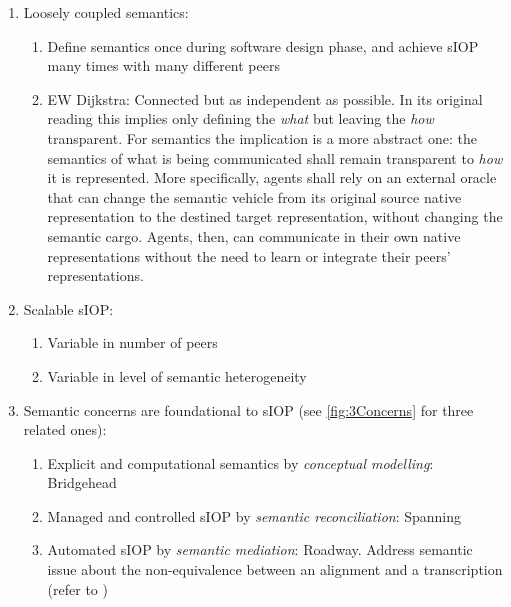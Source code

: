 \documentclass[a4paper,11pt,oneside,oldfontcommands]{memoir}
\theoremstyle{definition}
\theoremstyle{break}		%
\numberwithin{equation}{chapter}
\numberwithin{figure}{chapter}
\begin{document}
\begin{enumerate}
\def\labelenumi{\arabic{enumi}.}
\tightlist
\item
  Loosely coupled semantics:

  \begin{enumerate}
  \def\labelenumii{\roman{enumii}.}
  \tightlist
  \item
    Define semantics once during software design phase, and achieve sIOP
    many times with many different peers
  \item
    EW Dijkstra: Connected but as independent as possible. In its
    original reading this implies only defining the \emph{what} but
    leaving the \emph{how} transparent. For semantics the implication is
    a more abstract one: the semantics of what is being communicated
    shall remain transparent to \emph{how} it is represented. More
    specifically, agents shall rely on an external oracle that can
    change the semantic vehicle from its original source native
    representation to the destined target representation, without
    changing the semantic cargo. Agents, then, can communicate in their
    own native representations without the need to learn or integrate
    their peers' representations.
  \end{enumerate}
\item
  Scalable sIOP:

  \begin{enumerate}
  \def\labelenumii{\roman{enumii}.}
  \tightlist
  \item
    Variable in number of peers
  \item
    Variable in level of semantic heterogeneity
  \end{enumerate}
\item
  Semantic concerns are foundational to sIOP (see \cref{fig:3Concerns}
  for three related ones):

  \begin{enumerate}
  \def\labelenumii{\roman{enumii}.}
  \tightlist
  \item
    Explicit and computational semantics by \emph{conceptual modelling}:
    Bridgehead
  \item
    Managed and controlled sIOP by \emph{semantic reconciliation}:
    Spanning
  \item
    Automated sIOP by \emph{semantic mediation}: Roadway. Address
    semantic issue about the non-equivalence between an alignment and a
    transcription (refer to \cite{Brandt2018b})
  \end{enumerate}
\end{enumerate}
\end{document}
